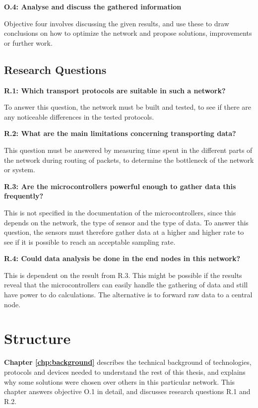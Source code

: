 \newpage
\noindent\textbf{O.4: Analyse and discuss the gathered information}

\noindent Objective four involves discussing the given results, and use these to draw conclusions on how to optimize the network and propose solutions, improvements or further work. 

\subsection{Research Questions}

\noindent \textbf{R.1: Which transport protocols are suitable in such a network?}

\noindent To answer this question, the network must be built and tested, to see if there are any noticeable differences in the tested protocols.

\noindent\textbf{R.2: What are the main limitations concerning transporting data?}

\noindent This question must be answered by measuring time spent in the different parts of the network during routing of packets, to determine the bottleneck of the network or system. 

\noindent\textbf{R.3: Are the \glspl{microcontroller} powerful enough to gather data this frequently?}

\noindent This is not specified in the documentation of the \glspl{microcontroller}, since this depends on the network, the type of sensor and the type of data. To answer this question, the sensors must therefore gather data at a higher and higher rate to see if it is possible to reach an acceptable sampling rate. 

\noindent\textbf{R.4: Could data analysis be done in the end nodes in this network?}

\noindent This is dependent on the result from R.3. This might be possible if the results reveal that the \glspl{microcontroller} can easily handle the gathering of data and still have power to do calculations. The alternative is to forward raw data to a central node. 

\section{Structure}


\noindent \textbf{Chapter \ref{chp:background}} describes the technical background of technologies, protocols and devices needed to understand the rest of this thesis, and explains why some solutions were chosen over others in this particular network. This chapter answers objective O.1 in detail, and discusses research questions R.1 and R.2. 

